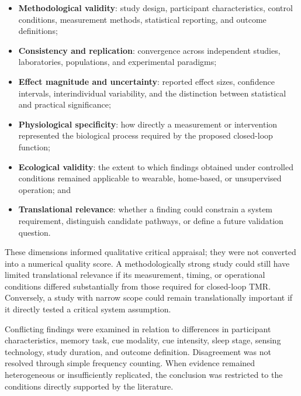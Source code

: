 \begin{itemize}
    \item \textbf{Methodological validity}: study design, participant
    characteristics, control conditions, measurement methods, statistical
    reporting, and outcome definitions;

    \item \textbf{Consistency and replication}: convergence across independent
    studies, laboratories, populations, and experimental paradigms;

    \item \textbf{Effect magnitude and uncertainty}: reported effect sizes,
    confidence intervals, interindividual variability, and the distinction
    between statistical and practical significance;

    \item \textbf{Physiological specificity}: how directly a measurement or
    intervention represented the biological process required by the proposed
    closed-loop function;

    \item \textbf{Ecological validity}: the extent to which findings obtained
    under controlled conditions remained applicable to wearable, home-based, or
    unsupervised operation; and

    \item \textbf{Translational relevance}: whether a finding could constrain a
    system requirement, distinguish candidate pathways, or define a future
    validation question.
\end{itemize}

These dimensions informed qualitative critical appraisal; they were not
converted into a numerical quality score. A methodologically strong study could
still have limited translational relevance if its measurement, timing, or
operational conditions differed substantially from those required for
closed-loop TMR. Conversely, a study with narrow scope could remain
translationally important if it directly tested a critical system assumption.

Conflicting findings were examined in relation to differences in participant
characteristics, memory task, cue modality, cue intensity, sleep stage, sensing
technology, study duration, and outcome definition. Disagreement was not
resolved through simple frequency counting. When evidence remained
heterogeneous or insufficiently replicated, the conclusion was restricted to
the conditions directly supported by the literature.

